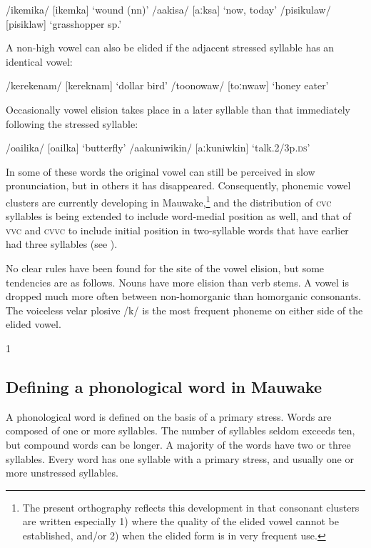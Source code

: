 \ea
\ea
/ikemika/  [i{{\textprimstress}kemka}]  `wound (nn)'
\ex
/aakisa/  [{{\textprimstress}aːksa}]  `now, today'
\ex
/pisikulaw/  [pi{{\textprimstress}siklaw}]  `grasshopper sp.'
\z
\z


A non-high vowel can also be elided if the adjacent stressed syllable has an identical vowel:

\ea
\ea
/kerekenam/  [ke{{\textprimstress}reknam}]  `dollar bird'
\ex
/toonowaw/  [{{\textprimstress}toːnwaw}]  `honey eater'
\z
\z


Occasionally vowel elision takes place in a later syllable than that immediately following the stressed syllable: 

\ea
\ea
/o{\textphi}a{\textphi}ilika/  [o{{\textprimstress}}{\textphi}a{\textphi}ilka]  `butterfly'
\ex
/aakuniwikin/  [aːkuniwkin]  `talk.2/3p.\textsc{ds}'
\z
\z

In some of these words the original vowel can still be perceived in slow pronunciation, but in others it has disappeared. Consequently, phonemic vowel clusters are currently developing in Mauwake,\footnote{The present orthography reflects this development in that consonant clusters are written especially 1) where the quality of the elided vowel cannot be established, and/or 2) when the elided form is in very frequent use.} and the distribution of \textsc{cvc} syllables is being extended to include word-medial position as well, and that of \textsc{vvc} and \textsc{cvvc} to include initial position in two-syllable words that have earlier had three syllables (see ).

No clear rules have been found for the site of the vowel elision, but some tendencies are as follows. Nouns have more elision than verb stems. A vowel is dropped much more often between non-homorganic than homorganic consonants. The voiceless velar plosive /k/ is the most frequent phoneme on either side of the elided vowel.

1\label{sec:2:x}

\subsection{Defining a phonological word in Mauwake}\label{sec:2:y:x}

A phonological word is defined on the basis of a primary stress. Words are composed of one or more syllables. The number of syllables seldom exceeds ten, but compound words can be longer. A majority of the words have two or three syllables.  Every word has one syllable with a primary stress, and usually one or more unstressed syllables. 

